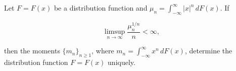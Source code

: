 Let $F = F(x)$ be a distribution function and $\mu_n = \int_{-\infty}^{\infty} |x|^n \, dF(x)$. If

$$\limsup_{n \to \infty} \frac{\mu_n^{1/n}}{n} < \infty,$$

then the moments $\{m_n\}_{n \geq 1}$, where $m_n = \int_{-\infty}^{\infty} x^n \, dF(x)$, determine the distribution function $F = F(x)$ uniquely.
